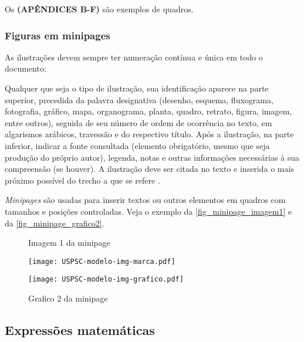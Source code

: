 Os \textbf{(APÊNDICES B-F)} são exemplos de quadros.

\subsubsection{Figuras em minipages}

As ilustrações devem sempre ter numeração contínua e única em todo o documento:


\begin{citacao}
	Qualquer que seja o tipo de ilustração, sua identificação aparece na parte
	superior, precedida da palavra designativa (desenho, esquema, fluxograma,
	fotografia, gráfico, mapa, organograma, planta, quadro, retrato, figura,
	imagem, entre outros), seguida de seu número de ordem de ocorrência no texto,
	em algarismos arábicos, travessão e do respectivo título. Após a ilustração, na
	parte inferior, indicar a fonte consultada (elemento obrigatório, mesmo que
	seja produção do próprio autor), legenda, notas e outras informações
	necessárias à sua compreensão (se houver). A ilustração deve ser citada no
	texto e inserida o mais próximo possível do trecho a que se
	refere \cite{nbr14724}.
\end{citacao}

\emph{Minipages} são usadas para inserir textos ou outros elementos em quadros
com tamanhos e posições controladas. Veja o exemplo da
\autoref{fig_minipage_imagem1} e da \autoref{fig_minipage_grafico2}.

\begin{figure}[H]
	\label{teste}
	\centering
	\begin{minipage}{0.4\textwidth}
		\centering
		\caption{Imagem 1 da minipage} \label{fig_minipage_imagem1}
		\texttt{[image: USPSC-modelo-img-marca.pdf]}
	\end{minipage}
	\hfill
	\begin{minipage}{0.4\textwidth}
		\centering
		\caption{Grafico 2 da minipage} \label{fig_minipage_grafico2}
		\texttt{[image: USPSC-modelo-img-grafico.pdf]}
	\end{minipage}
\end{figure}

\subsection{Expressões matemáticas}

